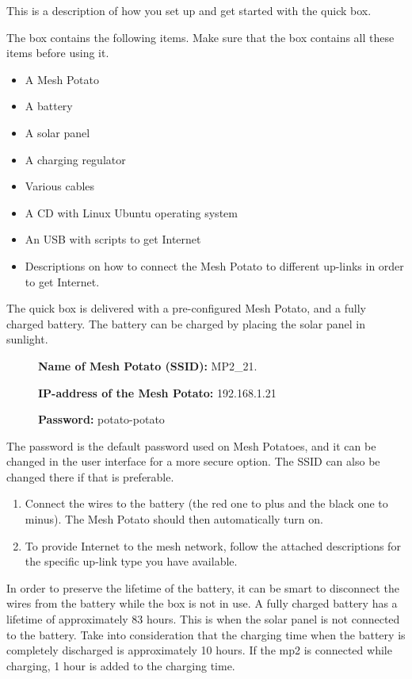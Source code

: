 This is a description of how you set up and get started with the \gls{quick} box. 

The box contains the following items. Make sure that the box contains all these items before using it. 
\begin{itemize}
\item A Mesh Potato
\item A battery
\item A solar panel
\item A charging regulator
\item Various cables
\item A CD with Linux Ubuntu operating system
\item An USB with scripts to get Internet 
\item Descriptions on how to connect the Mesh Potato to different up-links in order to get Internet. 
\end{itemize}

The \gls{quick} box is delivered with a pre-configured Mesh Potato, and a fully charged battery. The battery can be charged by placing the solar panel in sunlight. 

\begin{description}
\item[] \textbf{Name of Mesh Potato (SSID):} MP2_21.
\item[] \textbf{IP-address of the Mesh Potato:} 192.168.1.21
\item[] \textbf{Password:} potato-potato 
\end{description}

The password is the default password used on Mesh Potatoes, and it can be changed in the user interface for a more secure option. The SSID can also be changed there if that is preferable. 

\begin{enumerate}
\item Connect the wires to the battery (the red one to plus and the black one to minus). The Mesh Potato should then automatically turn on. 
\item To provide Internet to the mesh network, follow the attached descriptions for the specific up-link type you have available. 
\end{enumerate} 

In order to preserve the lifetime of the battery, it can be smart to disconnect the wires from the battery while the box is not in use. A fully charged battery has a lifetime of approximately 83 hours. This is when the solar panel is not connected to the battery. Take into consideration that the charging time when the battery is completely discharged is approximately 10 hours. If the \gls{mp2} is connected while charging, 1 hour is added to the charging time. 
